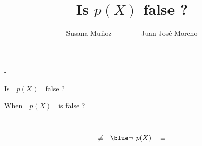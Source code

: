 \documentclass[pdf,slideColor,contemporain]{prosper}
\title{\black Is $p(X)$ false ?}
\author{Susana Mu\~{n}oz ~~~~~~~ Juan Jos\'{e} Moreno}
\begin{document}
\maketitle
\begin{slide}{-}
{\Huge

\begin{flushright}
\vspace{1.5 cm}
{\blue Is}  $~~~p(X)~~~$ false ?
\end{flushright}

\vspace{2 cm}

{\flushleft
{\blue When} $~~~p(X)~~~$ is false ?
\vspace{1.5 cm}

}

}
\end{slide}

 
 
\begin{slide}{-}
{\center
{\Huge

\vspace{1.5 cm}

 $$ \not\equiv ~~{\blue \neg ~p(X)}~~~ \equiv $$
\vspace{1.5 cm}
}
}
\end{slide}
\end{document}
